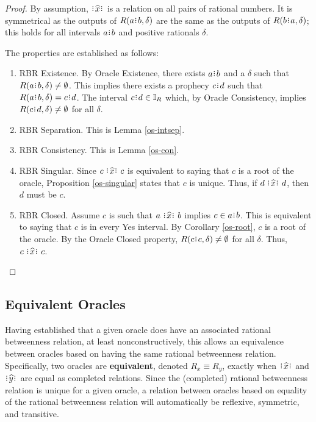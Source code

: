 \documentclass[12pt]{article}
\begin{document}
\begin{proof}
    By assumption, $\xora$ is a relation on all pairs of rational numbers. It is symmetrical as the outputs of $R(a\rint b, \delta)$ are the same as the outputs of $R(b\rint a, \delta)$; this holds for all intervals $a\rint b$ and positive rationals $\delta$.

    The properties are established as follows:  
    \begin{enumerate}
        \item RBR Existence. By Oracle Existence, there exists $a\rint b$  and a $\delta$ such that $R(a\rint b, \delta) \neq \emptyset$. This implies there exists a prophecy $c\rint d$ such that $R(a\rint b, \delta) = c\rint d$. The interval $c\rint d \in \mathbb{I}_R$ which, by Oracle Consistency, implies $R(c\rint d, \delta) \neq \emptyset$ for all $\delta$.  
        \item RBR Separation. This is Lemma \ref{os-intsep}.
        \item RBR Consistency. This is Lemma \ref{os-con}.
        \item RBR Singular. Since $c \xora c$ is equivalent to saying that $c$ is a root of the oracle, Proposition \ref{os-singular}  states that $c$ is unique. Thus, if $d \xora d$, then $d$ must be $c$. 
        \item RBR Closed. Assume $c$ is such that $a \xora b$ implies $c \in a\rint b$. This is equivalent to saying that $c$ is in every Yes interval. By Corollary \ref{os-root}, $c$ is a root of the oracle. By the Oracle Closed property, $R(c\rint c, \delta) \neq \emptyset$ for all $\delta$. Thus, $c \xora c$.
    \end{enumerate}
\end{proof}

\subsection{Equivalent Oracles}

Having established that a given oracle does have an associated rational betweenness relation, at least nonconstructively, this allows an equivalence between oracles based on having the same rational betweenness relation. Specifically, two oracles are \textbf{equivalent}, denoted $R_x \equiv R_y$, exactly when $\xora$ and $\xora[y]$ are equal as completed relations. Since the (completed) rational betweenness relation is unique for a given oracle, a relation between oracles based on equality of the rational betweenness relation will automatically be reflexive, symmetric, and transitive. 
\end{document}
